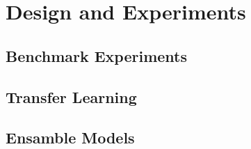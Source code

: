 \chapter{Design and Experiments}

\section{Benchmark Experiments}

\section{Transfer Learning}

\section{Ensamble Models}